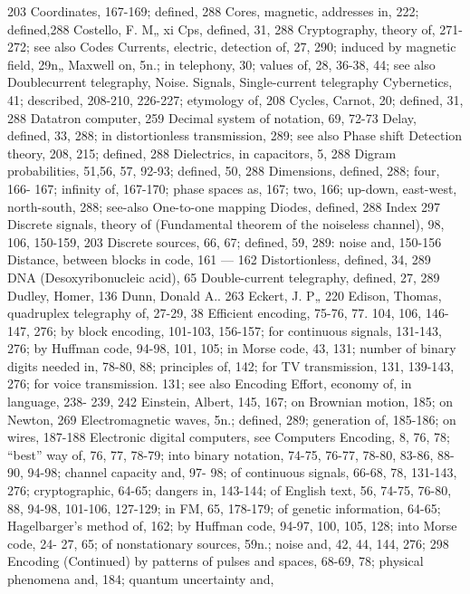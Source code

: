 {{{{{{{{{{{{{{{203
Coordinates, 167-169; defined, 288
Cores, magnetic, addresses in, 222;
defined,288
Costello, F. M„ xi
Cps, defined, 31, 288
Cryptography, theory of, 271-272; see
also Codes
Currents, electric, detection of, 27, 290;
induced by magnetic field, 29n„ Maxwell
on, 5n.; in telephony, 30; values
of, 28, 36-38, 44; see also Doublecurrent
telegraphy, Noise. Signals,
Single-current telegraphy
Cybernetics, 41; described, 208-210,
226-227; etymology of, 208
Cycles, Carnot, 20; defined, 31, 288
Datatron computer, 259
Decimal system of notation, 69, 72-73
Delay, defined, 33, 288; in distortionless
transmission, 289; see also Phase
shift
Detection theory, 208, 215; defined, 288
Dielectrics, in capacitors, 5, 288
Digram probabilities, 51,56, 57, 92-93;
defined, 50, 288
Dimensions, defined, 288; four, 166-
167; infinity of, 167-170; phase
spaces as, 167; two, 166; up-down,
east-west, north-south, 288; see-also
One-to-one mapping
Diodes, defined, 288
Index 297
Discrete signals, theory of (Fundamental
theorem of the noiseless channel),
98, 106, 150-159, 203
Discrete sources, 66, 67; defined, 59,
289: noise and, 150-156
Distance, between blocks in code, 161 —
162
Distortionless, defined, 34, 289
DNA (Desoxyribonucleic acid), 65
Double-current telegraphy, defined, 27,
289
Dudley, Homer, 136
Dunn, Donald A.. 263
Eckert, J. P„ 220
Edison, Thomas, quadruplex telegraphy
of, 27-29, 38
Efficient encoding, 75-76, 77. 104, 106,
146-147, 276; by block encoding,
101-103, 156-157; for continuous
signals, 131-143, 276; by Huffman
code, 94-98, 101, 105; in Morse
code, 43, 131; number of binary
digits needed in, 78-80, 88; principles
of, 142; for TV transmission,
131, 139-143, 276; for voice transmission.
131; see also Encoding
Effort, economy of, in language, 238-
239, 242
Einstein, Albert, 145, 167; on Brownian
motion, 185; on Newton, 269
Electromagnetic waves, 5n.; defined,
289; generation of, 185-186; on
wires, 187-188
Electronic digital computers, see Computers
Encoding, 8, 76, 78; “best” way of, 76,
77, 78-79; into binary notation,
74-75, 76-77, 78-80, 83-86, 88-90,
94-98; channel capacity and, 97-
98; of continuous signals, 66-68,
78, 131-143, 276; cryptographic,
64-65; dangers in, 143-144; of
English text, 56, 74-75, 76-80, 88,
94-98, 101-106, 127-129; in FM,
65, 178-179; of genetic information,
64-65; Hagelbarger’s method of,
162; by Huffman code, 94-97, 100,
105, 128; into Morse code, 24-
27, 65; of nonstationary sources,
59n.; noise and, 42, 44, 144, 276;
298
Encoding (Continued)
by patterns of pulses and spaces,
68-69, 78; physical phenomena
and, 184; quantum uncertainty and,
}}}}}}}}}}}}}}}

